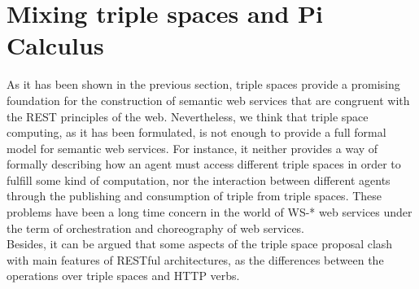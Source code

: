 \section{Mixing triple spaces and Pi Calculus}
As it has been shown in the previous section, triple spaces provide a promising foundation for the construction of
semantic web services that are congruent with the REST principles of the web. 
Nevertheless, we think that triple space computing, as it has been formulated, is not enough to provide a full formal
model for semantic web services. For instance, it neither provides a way of formally describing how an agent must access different
triple spaces in order to fulfill some kind of computation, nor the interaction between different agents through the
publishing and consumption of triple from triple spaces. These problems have been a long time concern in the world of WS-* web services under the term of orchestration and
choreography of web services.\\
Besides, it can be argued that some aspects of the triple space proposal clash with main features of RESTful architectures, as the differences between the
operations over triple spaces and HTTP verbs.\\

